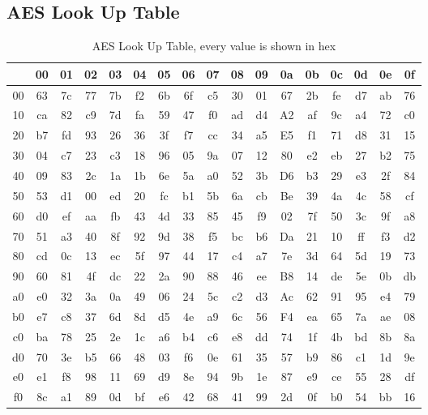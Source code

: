 \documentclass[a4paper, openany]{book}
\begin{document}
\begin{appendix}
\chapter{AES Look Up Table}
\label{AESLUT}
\begin{table}[!htb]
\centering
\captionsetup{width=.8\linewidth}
\begin{tabular}{c || c c c c c c c c c c c c c c c c}
\hline
   & 00 & 01 & 02 & 03 & 04 & 05 & 06 & 07 & 08 & 09 & 0a & 0b & 0c  & 0d & 0e & 0f\\
\hline
00 & 63 & 7c & 77 & 7b & f2 & 6b & 6f & c5 & 30 & 01 & 67 & 2b & fe  & d7 & ab & 76\\
10 & ca & 82 & c9 & 7d & fa & 59 & 47 & f0 & ad & d4 & A2 & af & 9c  & a4 & 72 & c0\\
20 & b7 & fd & 93 & 26 & 36 & 3f & f7 & cc & 34 & a5 & E5 & f1 & 71  & d8 & 31 & 15\\
30 & 04 & c7 & 23 & c3 & 18 & 96 & 05 & 9a & 07 & 12 & 80 & e2 & eb  & 27 & b2 & 75\\
40 & 09 & 83 & 2c & 1a & 1b & 6e & 5a & a0 & 52 & 3b & D6 & b3 & 29  & e3 & 2f & 84\\
50 & 53 & d1 & 00 & ed & 20 & fc & b1 & 5b & 6a & cb & Be & 39 & 4a  & 4c & 58 & cf\\
60 & d0 & ef & aa & fb & 43 & 4d & 33 & 85 & 45 & f9 & 02 & 7f & 50  & 3c & 9f & a8\\
70 & 51 & a3 & 40 & 8f & 92 & 9d & 38 & f5 & bc & b6 & Da & 21 & 10  & ff & f3 & d2\\
80 & cd & 0c & 13 & ec & 5f & 97 & 44 & 17 & c4 & a7 & 7e & 3d & 64  & 5d & 19 & 73\\
90 & 60 & 81 & 4f & dc & 22 & 2a & 90 & 88 & 46 & ee & B8 & 14 & de  & 5e & 0b & db\\
a0 & e0 & 32 & 3a & 0a & 49 & 06 & 24 & 5c & c2 & d3 & Ac & 62 & 91  & 95 & e4 & 79\\
b0 & e7 & c8 & 37 & 6d & 8d & d5 & 4e & a9 & 6c & 56 & F4 & ea & 65  & 7a & ae & 08\\
c0 & ba & 78 & 25 & 2e & 1c & a6 & b4 & c6 & e8 & dd & 74 & 1f & 4b  & bd & 8b & 8a\\
d0 & 70 & 3e & b5 & 66 & 48 & 03 & f6 & 0e & 61 & 35 & 57 & b9 & 86  & c1 & 1d & 9e\\
e0 & e1 & f8 & 98 & 11 & 69 & d9 & 8e & 94 & 9b & 1e & 87 & e9 & ce  & 55 & 28 & df\\
f0 & 8c & a1 & 89 & 0d & bf & e6 & 42 & 68 & 41 & 99 & 2d & 0f & b0  & 54 & bb & 16
\end{tabular}
\caption[AES]%
{AES Look Up Table, every value is shown in hex}
\label{tab:AESTable}
\end{table}
\end{appendix}
\end{document}

